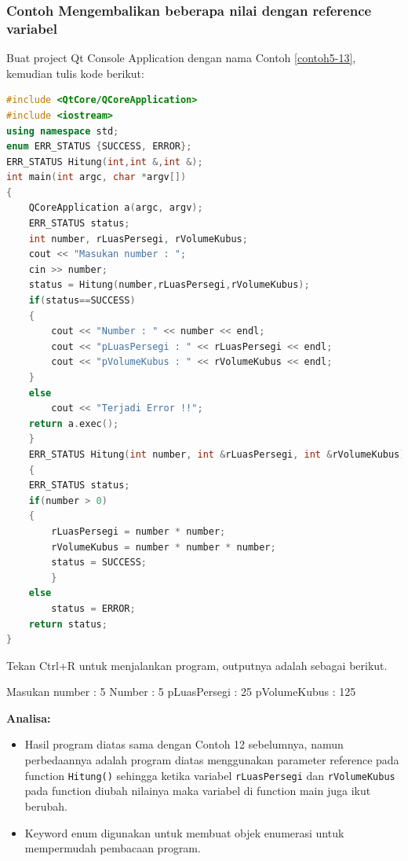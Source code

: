 \subsubsection*{Contoh  Mengembalikan beberapa nilai dengan reference variabel}

Buat project Qt Console Application dengan nama Contoh \ref{contoh5-13}, kemudian
tulis kode berikut:

\begin{lstlisting}[language=c++, caption=Mengembalikan beberapa nilai dengan reference variabel, label=contoh5-13]
#include <QtCore/QCoreApplication>
#include <iostream>
using namespace std;
enum ERR_STATUS {SUCCESS, ERROR};
ERR_STATUS Hitung(int,int &,int &);
int main(int argc, char *argv[])
{
    QCoreApplication a(argc, argv);
    ERR_STATUS status;
    int number, rLuasPersegi, rVolumeKubus;
    cout << "Masukan number : ";
    cin >> number;
    status = Hitung(number,rLuasPersegi,rVolumeKubus);
    if(status==SUCCESS)
    {
        cout << "Number : " << number << endl;
        cout << "pLuasPersegi : " << rLuasPersegi << endl;
        cout << "pVolumeKubus : " << rVolumeKubus << endl;
    }
    else
        cout << "Terjadi Error !!";
    return a.exec();
    }
    ERR_STATUS Hitung(int number, int &rLuasPersegi, int &rVolumeKubus)
    {
    ERR_STATUS status;
    if(number > 0)
    {
        rLuasPersegi = number * number;
        rVolumeKubus = number * number * number;
        status = SUCCESS;
        }
    else
        status = ERROR;
    return status;
}
\end{lstlisting}

Tekan Ctrl+R untuk menjalankan program, outputnya adalah sebagai
berikut.

\begin{lcverbatim}
Masukan number : 5
Number : 5
pLuasPersegi : 25
pVolumeKubus : 125
\end{lcverbatim}

\textbf{Analisa:}

\begin{itemize}

\item
  Hasil program diatas sama dengan Contoh 12 sebelumnya, namun
  perbedaannya adalah program diatas menggunakan parameter reference
  pada function \texttt{Hitung()} sehingga ketika variabel
  \texttt{rLuasPersegi} dan \texttt{rVolumeKubus} pada function diubah
  nilainya maka variabel di function main juga ikut berubah.
\item
  Keyword enum digunakan untuk membuat objek enumerasi untuk mempermudah
  pembacaan program.
\end{itemize}

